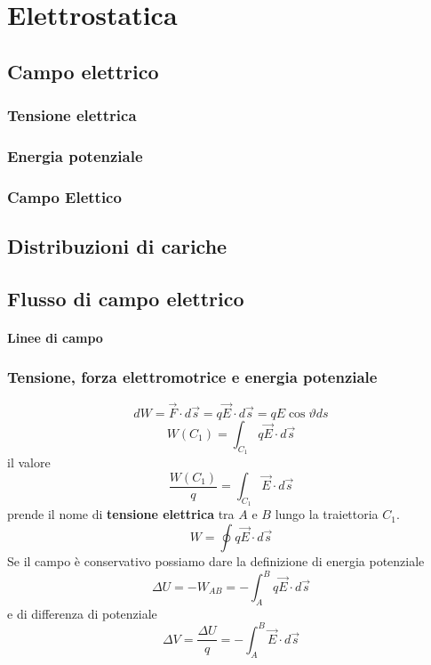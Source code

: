 \documentclass[x11names]{report}
\begin{document}
	

\tableofcontents
\newpage
	
\chapter{Elettrostatica}
\section{Campo elettrico}
\subsection{Tensione elettrica}
\subsection{Energia potenziale}
\subsection{Campo Elettico}

\section{Distribuzioni di cariche}
\section{Flusso di campo elettrico}

\subsubsection{Linee di campo}

\subsection{Tensione, forza elettromotrice e energia potenziale}
\[ 
dW = \vec{F}\cdot d\vec{s} = q \vec{E} \cdot d\vec{s} = qE\cos\vartheta ds
\]
\[ 
W(C_{1}) = \int_{C_{1}} q\vec{E} \cdot d\vec{s}
\]
il valore
\[ 
\frac{W(C_{1})}{q} = \int_{C_{1}} \vec{E} \cdot d\vec{s}
\]
prende il nome di \textbf{tensione elettrica} tra \(A\) e \(B\) lungo la traiettoria \(C_{1}\).
\[ 
W = \oint q\vec{E}\cdot d\vec{s}
\]
Se il campo è conservativo possiamo dare la definizione di energia potenziale
\[ 
\Delta U = -W_{AB} = - \int_{A}^B q\vec{E}\cdot d\vec{s}
\]
e di differenza di potenziale
\[ 
\Delta V = \frac{\Delta U}{q} = - \int_{A}^B \vec{E}\cdot d\vec{s}
\]
\end{document}
